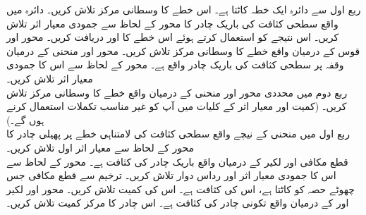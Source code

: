 ربع اول سے دائرہ   ایک خطہ کاٹتا ہے۔ اس خطے  کا وسطانی مرکز تلاش کریں۔
دائرہ  میں واقع   سطحی کثافت   کی باریک چادر کا محور  کے لحاظ سے جمودی معیار اثر تلاش کریں۔ اس نتیجے  کو استعمال کرتے ہوئے اس خطے کا  اور  دریافت کریں۔
محور  اور قوس  کے درمیان  واقع  خطے کا وسطانی مرکز تلاش کریں۔
محور  اور  منحنی  کے درمیان وقفہ  پر سطحی  کثافت  کی باریک چادر واقع  ہے۔ محور  کے لحاظ سے اس کا جمودی معیار اثر تلاش کریں۔
\\
ربع دوم میں محددی محور اور منحنی  کے درمیان واقع  خطے کا وسطانی مرکز تلاش کریں۔ (کمیت اور معیار اثر کے کلیات میں آپ کو غیر مناسب تکملات استعمال کرنے ہوں گے۔)
\\
ربع اول میں منحنی  کے نیچے    واقع سطحی کثافت  کی لامتناہی خطے پر پھیلی  چادر   کا محور  کے لحاظ سے معیار اثر  اول تلاش کریں۔
\\
قطع مکافی  اور لکیر  کے درمیان واقع  باریک چادر کی کثافت  ہے۔ محور  کے لحاظ سے اس کا جمودی معیار اثر اور رداس دوار تلاش کریں۔ 
ترخیم  سے  قطع مکافی   جس چھوٹے حصہ کو کاٹتا ہے، اس کی کثافت  ہے۔ اس کی کمیت تلاش کریں۔
محور  اور  لکیر  اور  کے درمیان واقع تکونی چادر کی کثافت  ہے۔ اس چادر کا مرکز کمیت تلاش کریں۔
